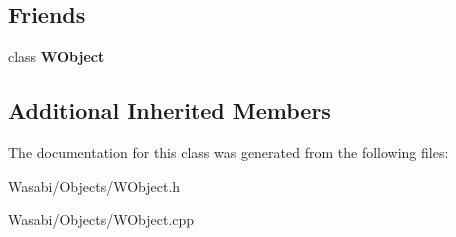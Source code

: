 \subsection*{Friends}
\begin{DoxyCompactItemize}
\item 
class {\bfseries W\+Object}\hypertarget{class_w_object_manager_a703e2c74495afdc3c9205669cd3517df}{}\label{class_w_object_manager_a703e2c74495afdc3c9205669cd3517df}

\end{DoxyCompactItemize}
\subsection*{Additional Inherited Members}


The documentation for this class was generated from the following files\+:\begin{DoxyCompactItemize}
\item 
Wasabi/\+Objects/W\+Object.\+h\item 
Wasabi/\+Objects/W\+Object.\+cpp\end{DoxyCompactItemize}

